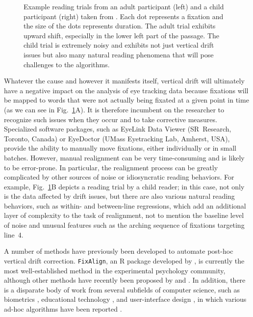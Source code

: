 \documentclass[doc,biblatex]{apa7}
\begin{document}
	\begin{figure}
	\vspace*{2pt}
	\caption{Example reading trials from an adult participant (left) and a child participant (right) taken from \textcite{Pescuma:0000}. Each dot represents a fixation and the size of the dots represents duration. The adult trial exhibits upward shift, especially in the lower left part of the passage. The child trial is extremely noisy and exhibits not just vertical drift issues but also many natural reading phenomena that will pose challenges to the algorithms.}
	\label{fig01}
	\end{figure}

Whatever the cause and however it manifests itself, vertical drift will ultimately have a negative impact on the analysis of eye tracking data because fixations will be mapped to words that were not actually being fixated at a given point in time (as we can see in Fig.~\ref{fig01}A). It is therefore incumbent on the researcher to recognize such issues when they occur and to take corrective measures. Specialized software packages, such as EyeLink Data Viewer (SR~Research, Toronto, Canada) or EyeDoctor (UMass Eyetracking Lab, Amherst, USA), provide the ability to manually move fixations, either individually or in small batches. However, manual realignment can be very time-consuming and is likely to be error-prone. In particular, the realignment process can be greatly complicated by other sources of noise or idiosyncratic reading behaviors. For example, Fig.~\ref{fig01}B depicts a reading trial by a child reader; in this case, not only is the data affected by drift issues, but there are also various natural reading behaviors, such as within- and between-line regressions, which add an additional layer of complexity to the task of realignment, not to mention the baseline level of noise and unusual features such as the arching sequence of fixations targeting line~4.

A number of methods have previously been developed to automate post-hoc vertical drift correction. \texttt{FixAlign}, an R package developed by \textcite{Cohen:2013}, is currently the most well-established method in the experimental psychology community, although other methods have recently been proposed by \textcite{Schroeder:0000} and \textcite{Spakov:2019}. In addition, there is a disparate body of work from several subfields of computer science, such as biometrics \parencite{Abdulin:2015}, educational technology \parencite{Hyrskykari:2006}, and user-interface design \parencite{Beymer:2005}, in which various ad-hoc algorithms have been reported \parencite[see also][]{LimaSanches:2015,Carl:2013,Mishra:2012,MartinezGomez:2012,Yamaya:2017}.
\end{document}
